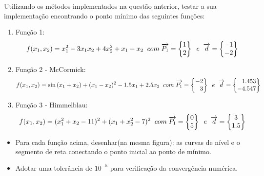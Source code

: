 \documentclass[10pt, a4paper]{article}
\begin{document}
Utilizando os métodos implementados na questão anterior, testar a sua implementação encontrando o ponto mínimo
das seguintes funções:

\begin{enumerate}
  \item Função 1: 
  \begin{equation*}
    f(x_1, x_2) = x_1^2 - 3x_1x_2 + 4x_2^2 + x_1 - x_2 \;\; com \;\; \\
    \overrightarrow{P_1} = 
    \begin{Bmatrix}
     1 \\ 2
    \end{Bmatrix} \;\; e \;\; \overrightarrow{d} =
    \begin{Bmatrix}
    -1 \\ -2
    \end{Bmatrix}
 \end{equation*}

 \item Função 2 - McCormick:
 \begin{equation*}
  f(x_1, x_2) = \sin{(x_1 + x_2)} + (x_1 - x_2)^2 - 1.5x_1 + 2.5x_2 \;\; com \;\; \\
  \overrightarrow{P_1} = 
  \begin{Bmatrix}
   -2 \\ \phantom{-}3
  \end{Bmatrix} \;\; e \;\; \overrightarrow{d} =
  \begin{Bmatrix}
  \phantom{-}1.453 \\ -4.547
  \end{Bmatrix}
\end{equation*}

\item Função 3 - Himmelblau:
 \begin{equation*}
  f(x_1, x_2) = (x_1^2 + x_2 - 11)^2 + (x_1 + x_2^2 - 7)^2 \;\; com \;\; \\
  \overrightarrow{P_1} = 
  \begin{Bmatrix}
   0 \\ 5
  \end{Bmatrix} \;\; e \;\; \overrightarrow{d} =
  \begin{Bmatrix}
  3 \\ 1.5
  \end{Bmatrix}
\end{equation*}

\end{enumerate}

\begin{itemize}
  \item Para cada função acima, desenhar(na mesma figura): as curvas de nível e o segmento de reta
  conectando o ponto inicial ao ponto de mínimo.
  \item Adotar uma tolerância de $10^{-5}$ para verificação da convergência numérica.
\end{itemize}
\end{document}
